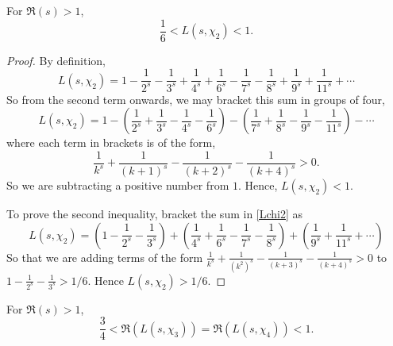 \documentclass{unswmaths}
\begin{document}
    \begin{lemma}
    \label{charOrth}
        For $\Re(s) > 1$, 
        \begin{equation*}
            \frac{1}{6} < L(s,\chi_2) < 1.
        \end{equation*}
    \end{lemma}
    \begin{proof}
        By definition,
        \begin{equation}
        \label{Lchi2}
            L(s,\chi_2) = 1-\frac{1}{2^s}-\frac{1}{3^s}+\frac{1}{4^s}+\frac{1}{6^s}-\frac{1}{7^s}-\frac{1}{8^s}+\frac{1}{9^s}+\frac{1}{11^s}+\cdots
        \end{equation}
        So from the second term onwards, we may bracket this sum in groups of four,
        \begin{equation*}
            L(s,\chi_2) = 1-\left(\frac{1}{2^s}+\frac{1}{3^s}-\frac{1}{4^s}-\frac{1}{6^s}\right)-\left(\frac{1}{7^s}+\frac{1}{8^s}-\frac{1}{9^s}-\frac{1}{11^s}\right)-\cdots
        \end{equation*}
        where each term in brackets is of the form,
        \begin{equation*}
            \frac{1}{k^s}+\frac{1}{(k+1)^s}-\frac{1}{(k+2)^s}-\frac{1}{(k+4)^s} > 0.
        \end{equation*}
        So we are subtracting a positive number from $1$. Hence, $L(s,\chi_2) < 1$. 
        
        To prove the second inequality, bracket the sum in \ref{Lchi2} as
        \begin{equation*}
            L(s,\chi_2) = \left(1-\frac{1}{2^s}-\frac{1}{3^s}\right)+\left(\frac{1}{4^s}+\frac{1}{6^s}-\frac{1}{7^s}-\frac{1}{8^s}\right)+\left(\frac{1}{9^s}+\frac{1}{11^s}+\cdots\right)
        \end{equation*}
        So that we are adding terms of the form $\frac{1}{k^s}+\frac{1}{(k^2)^s}-\frac{1}{(k+3)^s}-\frac{1}{(k+4)^s} > 0$ to $1-\frac{1}{2^s}-\frac{1}{3^s} > 1/6$. Hence $L(s,\chi_2) > 1/6$.
    \end{proof}
    \begin{lemma}
        For $\Re(s) > 1$,
        \begin{equation*}
            \frac{3}{4} < \Re(L(s,\chi_3)) = \Re(L(s,\chi_4)) < 1.
        \end{equation*}
    \end{lemma}
\end{document}
